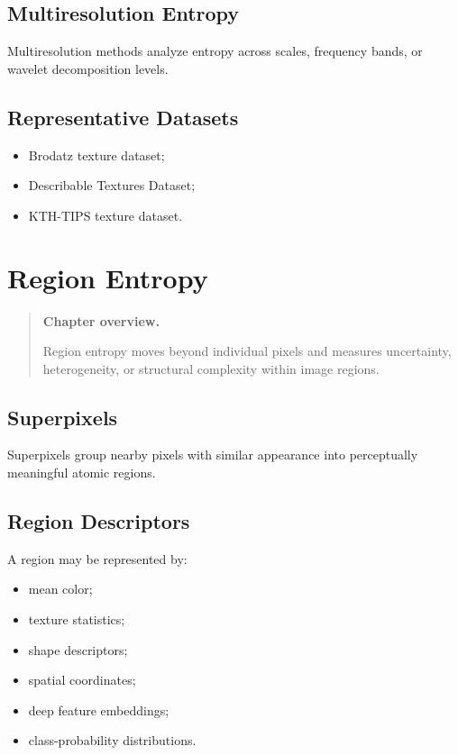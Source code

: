\documentclass[11pt,oneside]{book}
\theoremstyle{remark}
\newenvironment{chapteroverview}
{
	\begin{quote}
		\small
		\textbf{Chapter overview.}
	}
	{
	\end{quote}
}
\newenvironment{datasetlist}
{
	\begin{itemize}[label=\(\triangleright\)]
	}
	{
	\end{itemize}
}
\begin{document}
	\section{Multiresolution Entropy}
	
	Multiresolution methods analyze entropy across scales, frequency bands, or
	wavelet decomposition levels.
	
	\section*{Representative Datasets}
	
	\begin{datasetlist}
		\item Brodatz texture dataset;
		\item Describable Textures Dataset;
		\item KTH-TIPS texture dataset.
	\end{datasetlist}
	
	
	\chapter{Region Entropy}
	\label{chap:region-entropy}
	
	\begin{chapteroverview}
		Region entropy moves beyond individual pixels and measures uncertainty,
		heterogeneity, or structural complexity within image regions.
	\end{chapteroverview}
	
	\section{Superpixels}
	
	Superpixels group nearby pixels with similar appearance into perceptually
	meaningful atomic regions.
	
	\section{Region Descriptors}
	
	A region may be represented by:
	
	\begin{itemize}
		\item mean color;
		\item texture statistics;
		\item shape descriptors;
		\item spatial coordinates;
		\item deep feature embeddings;
		\item class-probability distributions.
	\end{itemize}
	
\end{document}
